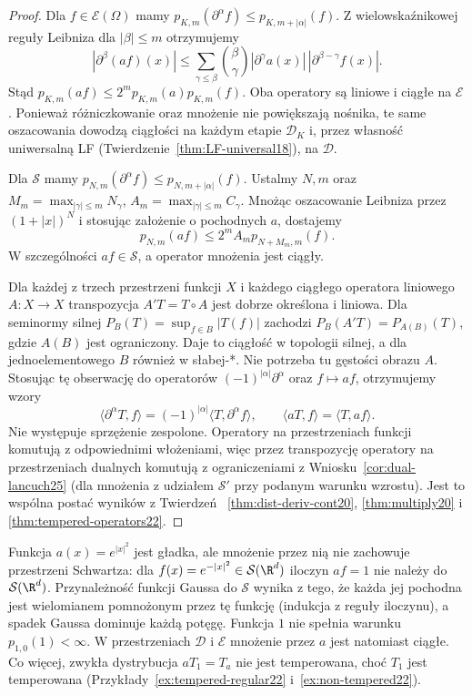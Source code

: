\begin{proof}
Dla $f\in\mathcal E(\Omega)$ mamy
$p_{K,m}(\partial^\alpha f)\le p_{K,m+|\alpha|}(f)$.
Z wielowskaźnikowej reguły Leibniza dla $|\beta|\le m$
otrzymujemy
\[
 |\partial^\beta(af)(x)|
 \le\sum_{\gamma\le\beta}\binom{\beta}{\gamma}
 |\partial^\gamma a(x)|\,|\partial^{\beta-\gamma}f(x)|.
\]
Stąd $p_{K,m}(af)\le 2^m p_{K,m}(a)p_{K,m}(f)$.
Oba operatory są liniowe i ciągłe na $\mathcal E$.
Ponieważ różniczkowanie oraz mnożenie nie powiększają
nośnika, te same oszacowania dowodzą ciągłości
na każdym etapie $\mathcal D_K$ i, przez własność
uniwersalną LF (Twierdzenie~\ref{thm:LF-universal18}),
na $\mathcal D$.

Dla $\mathcal S$ mamy
$p_{N,m}(\partial^\alpha f)\le p_{N,m+|\alpha|}(f)$.
Ustalmy $N,m$ oraz
$M_m=\max_{|\gamma|\le m}N_\gamma$,
$A_m=\max_{|\gamma|\le m}C_\gamma$.
Mnożąc oszacowanie Leibniza przez $(1+|x|)^N$
i stosując założenie o pochodnych $a$, dostajemy
\[
 p_{N,m}(af)\le 2^m A_m p_{N+M_m,m}(f).
\]
W szczególności $af\in\mathcal S$, a operator mnożenia
jest ciągły.

Dla każdej z trzech przestrzeni funkcji $X$ i każdego
ciągłego operatora liniowego $A:X\to X$ transpozycja
$A'T=T\circ A$ jest dobrze określona i liniowa.
Dla seminormy silnej $P_B(T)=\sup_{f\in B}|T(f)|$
zachodzi $P_B(A'T)=P_{A(B)}(T)$, gdzie $A(B)$ jest
ograniczony. Daje to ciągłość w topologii silnej,
a dla jednoelementowego $B$ również w słabej-*.
Nie potrzeba tu gęstości obrazu $A$.
Stosując tę obserwację do operatorów
$(-1)^{|\alpha|}\partial^\alpha$ oraz $f\mapsto af$,
otrzymujemy wzory
\[
 \langle\partial^\alpha T,f\rangle
 =(-1)^{|\alpha|}\langle T,\partial^\alpha f\rangle,
 \qquad
 \langle aT,f\rangle=\langle T,af\rangle.
\]
Nie występuje sprzężenie zespolone. Operatory
na przestrzeniach funkcji komutują z odpowiednimi
włożeniami, więc przez transpozycję operatory
na przestrzeniach dualnych komutują z ograniczeniami
z Wniosku~\ref{cor:dual-lancuch25} (dla mnożenia
z udziałem $\mathcal S'$ przy podanym warunku wzrostu).
Jest to wspólna postać wyników z Twierdzeń~
\ref{thm:dist-deriv-cont20}, \ref{thm:multiply20}
i \ref{thm:tempered-operators22}.
\end{proof}

\begin{przyklad}
\label{ex:not-multiplier25}
Funkcja $a(x)=e^{|x|^2}$ jest gładka, ale mnożenie przez nią
nie zachowuje przestrzeni Schwartza: dla
$f(x)=e^{-|x|^2}\in\mathcal S(\R^d)$ iloczyn $af=1$
nie należy do $\mathcal S(\R^d)$. Przynależność funkcji Gaussa do $\mathcal S$ wynika
z tego, że każda jej pochodna jest wielomianem
pomnożonym przez tę funkcję (indukcja z reguły
iloczynu), a spadek Gaussa dominuje każdą potęgę.
Funkcja $1$ nie spełnia warunku $p_{1,0}(1)<\infty$.
W przestrzeniach $\mathcal D$ i $\mathcal E$
mnożenie przez $a$ jest natomiast ciągłe.
Co więcej, zwykła dystrybucja $aT_1=T_a$ nie jest
temperowana, choć $T_1$ jest temperowana
(Przykłady~\ref{ex:tempered-regular22}
i~\ref{ex:non-tempered22}).
\end{przyklad}

